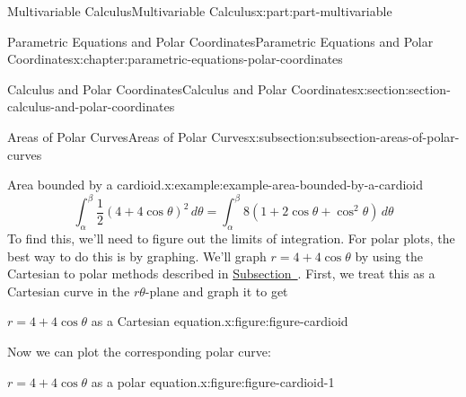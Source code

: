 \documentclass[twoside,10pt,]{tufte-book}
\numberwithin{equation}{part}
\begin{document}
\begin{partptx}{Multivariable Calculus}{}{Multivariable Calculus}{}{}{x:part:part-multivariable}
\begin{chapterptx}{Parametric Equations and Polar Coordinates}{}{Parametric Equations and Polar Coordinates}{}{}{x:chapter:parametric-equations-polar-coordinates}
\begin{sectionptx}{Calculus and Polar Coordinates}{}{Calculus and Polar Coordinates}{}{}{x:section:section-calculus-and-polar-coordinates}
\begin{subsectionptx}{Areas of Polar Curves}{}{Areas of Polar Curves}{}{}{x:subsection:subsection-areas-of-polar-curves}
\begin{example}{Area bounded by a cardioid.}{x:example:example-area-bounded-by-a-cardioid}
\begin{equation*}
\int_{\alpha}^{\beta}\frac{1}{2}(4+4\cos\theta)^{2}\,d\theta = \int_{\alpha}^{\beta}8(1+2\cos\theta+\cos^{2}\theta)\,d\theta
\end{equation*}
To find this, we'll need to figure out the limits of integration. For polar plots, the best way to do this is by graphing. We'll graph \(r=4+4\cos\theta\) by using the Cartesian to polar methods described in \hyperref[x:subsection:subsection-cartesian-to-polar-method]{Subsection~}. First, we treat this as a Cartesian curve in the \(r\theta\)-plane and graph it to get%
\begin{figureptx}{\(r = 4 + 4\cos\theta\) as a Cartesian equation.}{x:figure:figure-cardioid}{}%
\begin{image}{0}{1}{0}%
%
\end{image}%
\tcblower
\end{figureptx}%
Now we can plot the corresponding polar curve:%
\begin{figureptx}{\(r = 4 + 4\cos\theta\) as a polar equation.}{x:figure:figure-cardioid-1}{}%
\begin{image}{0}{1}{0}%
\end{image}
\end{figureptx}
\end{example}
\end{subsectionptx}
\end{sectionptx}
\end{chapterptx}
\end{partptx}
\end{document}
